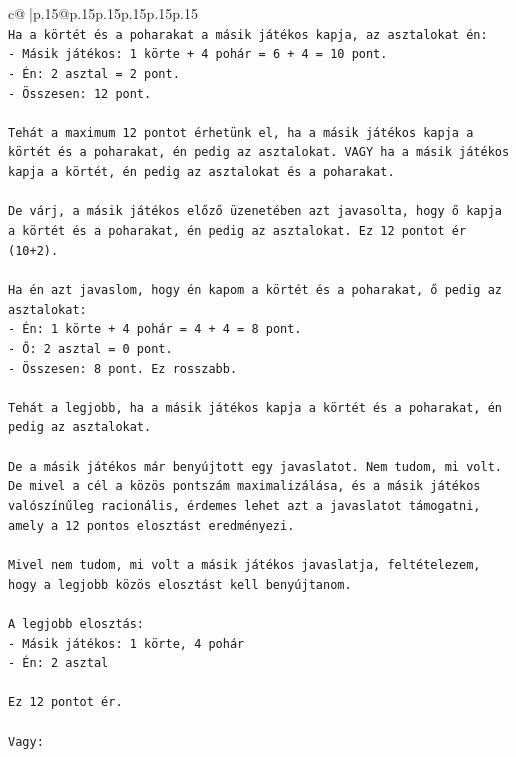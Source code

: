 \documentclass{article}
\begin{document}
{\begin{supertabular}{c@{$\;$}|p{.15\linewidth}@{}p{.15\linewidth}p{.15\linewidth}p{.15\linewidth}p{.15\linewidth}p{.15\linewidth}}
{{{\\ 
\texttt{Ha a körtét és a poharakat a másik játékos kapja, az asztalokat én:} \\
\texttt{{-} Másik játékos: 1 körte + 4 pohár = 6 + 4 = 10 pont.} \\
\texttt{{-} Én: 2 asztal = 2 pont.} \\
\texttt{{-} Összesen: 12 pont.} \\
\\ 
\texttt{Tehát a maximum 12 pontot érhetünk el, ha a másik játékos kapja a körtét és a poharakat, én pedig az asztalokat. VAGY ha a másik játékos kapja a körtét, én pedig az asztalokat és a poharakat.} \\
\\ 
\texttt{De várj, a másik játékos előző üzenetében azt javasolta, hogy ő kapja a körtét és a poharakat, én pedig az asztalokat. Ez 12 pontot ér (10+2).} \\
\\ 
\texttt{Ha én azt javaslom, hogy én kapom a körtét és a poharakat, ő pedig az asztalokat:} \\
\texttt{{-} Én: 1 körte + 4 pohár = 4 + 4 = 8 pont.} \\
\texttt{{-} Ő: 2 asztal = 0 pont.} \\
\texttt{{-} Összesen: 8 pont. Ez rosszabb.} \\
\\ 
\texttt{Tehát a legjobb, ha a másik játékos kapja a körtét és a poharakat, én pedig az asztalokat.} \\
\\ 
\texttt{De a másik játékos már benyújtott egy javaslatot. Nem tudom, mi volt. De mivel a cél a közös pontszám maximalizálása, és a másik játékos valószínűleg racionális, érdemes lehet azt a javaslatot támogatni, amely a 12 pontos elosztást eredményezi.} \\
\\ 
\texttt{Mivel nem tudom, mi volt a másik játékos javaslatja, feltételezem, hogy a legjobb közös elosztást kell benyújtanom.} \\
\\ 
\texttt{A legjobb elosztás:} \\
\texttt{{-} Másik játékos: 1 körte, 4 pohár} \\
\texttt{{-} Én: 2 asztal} \\
\\ 
\texttt{Ez 12 pontot ér.} \\
\\ 
\texttt{Vagy:} \\
}}}
\end{supertabular}}
\end{document}
